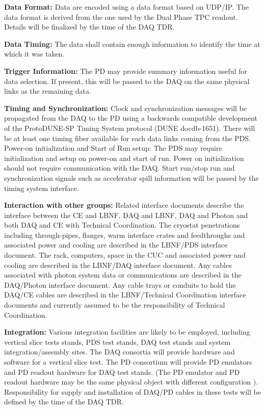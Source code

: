 \textbf{Data Format:} Data are encoded using a data format based on UDP/IP. The data format is derived from the one used by the Dual Phase TPC readout. Details will be finalized by the time of the DAQ TDR.

\textbf{Data Timing:} The data shall contain enough information to identify the time  at which it was taken.

\textbf{Trigger Information:} The PD may provide summary information useful for data selection. If present, this will be passed to the DAQ on the same physical links as the remaining data.

\textbf{Timing and Synchronization: }Clock and synchronization messages will be propagated from the DAQ to the PD using a backwards compatible development of the ProtoDUNE-SP Timing System protocol (DUNE docdb-1651). There will be at least one timing fiber available for each data links coming from the PDS. Power-on initialization and Start of Run setup:  The PDS may require initialization and setup on power-on and start of run. Power on initialization should not require communication with the DAQ. Start run/stop run and synchronization signals such as accelerator spill information will be passed by the timing system interface.

\textbf{Interaction with other groups: }Related interface documents describe the interface between the CE and LBNF, DAQ and LBNF, DAQ and Photon and both DAQ and CE with Technical Coordination. The cryostat penetrations including through-pipes, flanges, warm interface crates and feedthroughs and associated power and cooling are described in the LBNF/PDS interface document.  The rack, computers, space in the CUC and associated power and cooling are described in the LBNF/DAQ interface document. Any cables associated with photon system data or communications are described in the DAQ/Photon interface document. Any cable trays or conduits to hold the DAQ/CE cables are described in the LBNF/Technical Coordination interface documents and currently assumed to be the responsibility of Technical Coordination.

\textbf{Integration:} Various integration facilities are likely to be employed, including vertical slice tests stands, PDS test stands, DAQ test stands and system integration/assembly sites. The DAQ consortia will provide hardware and software for a vertical slice test. The PD consortium will provide PD emulators and PD readout hardware for DAQ test stands. (The PD emulator and PD readout hardware may be the same physical object with different configuration ). Responsibility for supply and installation of DAQ/PD cables in these tests will be defined by the time of the DAQ TDR.




